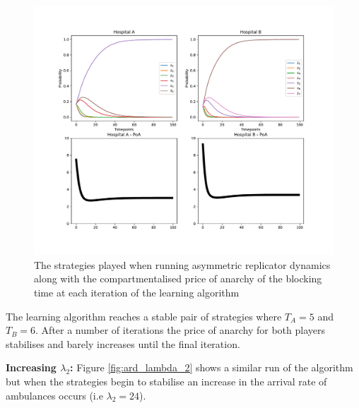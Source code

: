 \begin{figure}[H]
    \includegraphics[width=\textwidth]{imgs/asymmetric_rd_and_PoA/asymmetric_original.pdf}
    \caption{The strategies played when running asymmetric replicator dynamics
    along with the compartmentalised price of anarchy of the blocking time at
    each iteration of the learning algorithm}
    \label{fig:ard_original}
\end{figure}

The learning algorithm reaches a stable pair of 
strategies where \(T_A = 5\) and \(T_B = 6\). After a number of iterations the
price of anarchy for both players stabilises and barely increases until the 
final iteration. 

\textbf{Increasing \(\lambda_2\):}
Figure \ref{fig:ard_lambda_2} shows a similar run of the
algorithm but when the strategies begin to stabilise an increase in the
arrival rate of ambulances occurs (i.e \( \lambda_2 = 24 \)).


